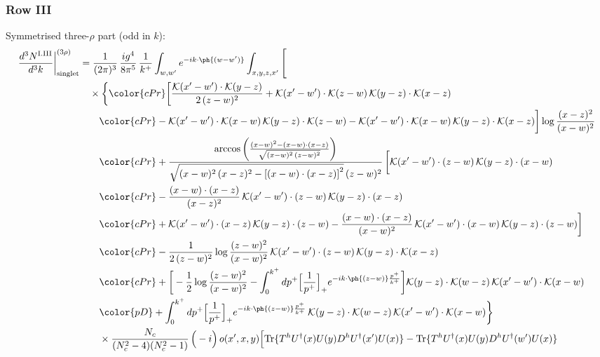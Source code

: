 \subsubsection*{Row III}
Symmetrised three-$\rho$ part (odd in $k$):
\begin{align}
\frac{d^{3}N^{\rm I.III}}{d^{3}k}\bigg|^{(3\rho)}_{\rm singlet}&=\frac{1}{(2\pi)^{3}}\,\frac{ig^{4}}{8\pi^{5}}\,\frac{1}{k^{+}}\int_{w,w'}e^{-ik\cdot\ph{(w-w')}}\int_{x,y,z,x'}\Bigg[\notag\\
&\quad\times\bigg\{{\color{cPr}\bigg[\frac{\mathcal{K}(x'-w')\cdot\mathcal{K}(y-z)}{2\,(z-w)^{2}}+\mathcal{K}(x'-w')\cdot\mathcal{K}(z-w)\,\mathcal{K}(y-z)\cdot\mathcal{K}(x-z)}\notag\\
&\qquad{\color{cPr}-\mathcal{K}(x'-w')\cdot\mathcal{K}(x-w)\,\mathcal{K}(y-z)\cdot\mathcal{K}(z-w)-\mathcal{K}(x'-w')\cdot\mathcal{K}(x-w)\,\mathcal{K}(y-z)\cdot\mathcal{K}(x-z)\bigg]\log\frac{(x-z)^{2}}{(x-w)^{2}}}\notag\\
&\qquad{\color{cPr}+\frac{\arccos\left(\frac{(x-w)^{2}-(x-w)\cdot (x-z)}{\sqrt{(x-w)^{2}\,(z-w)^{2}}}\right)}{\sqrt{(x-w)^{2}\,(x-z)^{2}-\left[(x-w)\cdot (x-z)\right]^{2}}\,(z-w)^{2}}\,\bigg[\mathcal{K}(x'-w')\cdot(z-w)\,\mathcal{K}(y-z)\cdot(x-w)}\notag\\
&\qquad{\color{cPr}-\frac{(x-w)\cdot(x-z)}{(x-z)^{2}}\,\mathcal{K}(x'-w')\cdot(z-w)\,\mathcal{K}(y-z)\cdot(x-z)}\notag\\
&\qquad{\color{cPr}+\mathcal{K}(x'-w')\cdot(x-z)\,\mathcal{K}(y-z)\cdot(z-w)-\frac{(x-w)\cdot(x-z)}{(x-w)^{2}}\,\mathcal{K}(x'-w')\cdot(x-w)\,\mathcal{K}(y-z)\cdot(z-w)\bigg]}\notag\\
&\qquad{\color{cPr}-\frac{1}{2\,(z-w)^{2}}\log\frac{(z-w)^{2}}{(x-w)^{2}}\,\mathcal{K}(x'-w')\cdot(z-w)\,\mathcal{K}(y-z)\cdot\mathcal{K}(x-z)}\notag\\
&\qquad{\color{cPr}+\bigg[-\frac{1}{2}\log\frac{(z-w)^{2}}{(x-w)^{2}}-\int_{0}^{k^{+}}dp^{+}\Big[\frac{1}{p^{+}}\Big]_{+}e^{-ik\cdot\ph{(z-w)}\frac{p^{+}}{k^{+}}}\bigg]\mathcal{K}(y-z)\cdot\mathcal{K}(w-z)\,\mathcal{K}(x'-w')\cdot\mathcal{K}(x-w)}\notag\\
&\qquad{\color{pD}+\int_{0}^{k^{+}}dp^{+}\Big[\frac{1}{p^{+}}\Big]_{+}e^{-ik\cdot\ph{(z-w)}\frac{p^{+}}{k^{+}}}\,\mathcal{K}(y-z)\cdot\mathcal{K}(w-z)\,\mathcal{K}(x'-w')\cdot\mathcal{K}(x-w)}\bigg\}\notag\\
&\qquad\times \frac{N_{c}}{(N_{c}^{2}-4)(N_{c}^{2}-1)}\,\Big(-i\Big)\,o(x',x,y)\Big[{\rm Tr}\{T^{h}U^{\dagger}(x)U(y)D^{h}U^{\dagger}(x')U(x)\}-{\rm Tr}\{T^{h}U^{\dagger}(x)U(y)D^{h}U^{\dagger}(w')U(x)\}\notag\\

\end{align}
